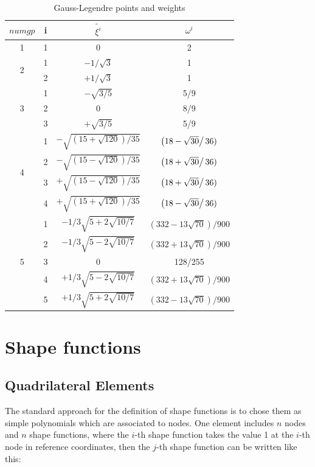 \documentclass{article}
\begin{document}
\begin{table}
	\begin{center}
		\caption{Gauss-Legendre points and weights}\label{tab: Guass table}
		\begin{tabular}{cccc}
			$numgp$         & i & $\tilde{\xi^i}$ & $\omega^i$  \\ \hline
			1                           &1& 0 & 2   \\ \hline
			\multirow{2}{*}{2} &1& $-1/\sqrt{3}$ & 1   \\
			&2& $+1/\sqrt{3}$ & 1   \\ \hline
			\multirow{3}{*}{3} &1& $-\sqrt{3/5}$ &5/9 \\
			&2& 0                &8/9 \\
			&3& $+\sqrt{3/5}$ &5/9 \\ \hline
			\multirow{4}{*}{4}&1& $-\sqrt{\left(15+\sqrt{120}\right)/35}$ & $\left(18-\sqrt{30}\right/36)$ \\
			&2& $-\sqrt{\left(15-\sqrt{120}\right)/35}$ & $\left(18+\sqrt{30}\right/36)$ \\
			&3& $+\sqrt{\left(15-\sqrt{120}\right)/35}$ & $\left(18+\sqrt{30}\right/36)$ \\
			&4& $+\sqrt{\left(15+\sqrt{120}\right)/35}$ & $\left(18-\sqrt{30}\right/36)$ \\ \hline
			\multirow{5}{*}{5}&1& $-1/3\sqrt{5+2\sqrt{10/7}}$ & $\left(332-13\sqrt{70}\right)/900$ \\
			&2& $-1/3\sqrt{5-2\sqrt{10/7}}$ & $\left(332+13\sqrt{70}\right)/900$ \\
			&3& 0 & 128/255 \\
			&4& $+1/3\sqrt{5-2\sqrt{10/7}}$ & $\left(332+13\sqrt{70}\right)/900$ \\
			&5& $+1/3\sqrt{5+2\sqrt{10/7}}$ & $\left(332-13\sqrt{70}\right)/900$ \\ \hline
		\end{tabular}
	\end{center}
	
\end{table}

\section{Shape functions}
\subsection{Quadrilateral Elements}
The standard approach for the definition of shape functions is to chose them as simple polynomials which are associated to nodes. One element includes $n$ nodes and $n$ shape functions, where the $i$-th shape function takes the value 1 at the $i$-th node in reference coordinates, then the $j$-th shape function can be written like this: \\
\end{document}
